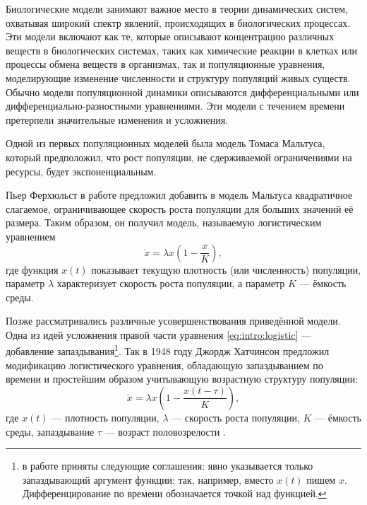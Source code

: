 
{\actuality} Биологические модели занимают важное место в теории динамических систем, охватывая широкий спектр явлений, происходящих в биологических процессах. Эти модели включают как те, которые описывают концентрацию различных веществ в биологических системах, таких как химические реакции в клетках или процессы обмена веществ в организмах, так и популяционные уравнения, моделирующие изменение численности и структуру популяций живых существ. Обычно модели популяционной динамики описываются дифференциальными или дифференциально-разностными уравнениями. 
Эти модели с течением времени претерпели значительные изменения и усложнения.

Одной из первых популяционных моделей была модель Томаса Мальтуса, который предположил, что рост популяции, не сдерживаемой ограничениями на ресурсы, будет экспоненциальным. %

Пьер Ферхюльст в работе \cite{Verhulst1838} предложил добавить в модель Мальтуса квадратичное слагаемое, ограничивающее скорость роста популяции для больших значений её размера. Таким образом, он получил модель, называемую логистическим уравнением
\begin{equation}
\label{eq:intro:logistic}
	\dot{x}=\lambda x\left(1-\frac{x}{K}\right),
\end{equation}
где функция $x(t)$ показывает текущую плотность (или численность) популяции, параметр $\lambda$ характеризует скорость роста популяции, а параметр $K$ --- ёмкость среды.

Позже рассматривались различные усовершенствования приведённой модели. Одна из идей усложнения правой части уравнения \eqref{eq:intro:logistic} --- добавление запаздывания\footnote{в работе приняты следующие соглашения: явно указывается только запаздывающий аргумент функции: так, например, вместо $x(t)$ пишем $x$. Дифференцирование по времени обозначается точкой над функцией.}. Так в 1948 году Джордж Хатчинсон предложил модификацию логистического уравнения, обладающую запаздыванием по времени и простейшим образом учитывающую возрастную структуру популяции:
%
\begin{equation}
\label{eq:intro:hutch}
	\dot{x}=\lambda x\left(1 - \frac{x(t-\tau)}{K}\right),
\end{equation}
%
где $x(t)$ --- плотность популяции, $\lambda$ --- скорость роста популяции, $K$ --- ёмкость среды, запаздывание $\tau$ --- возраст половозрелости \cite{Hutchinson1948}. %

